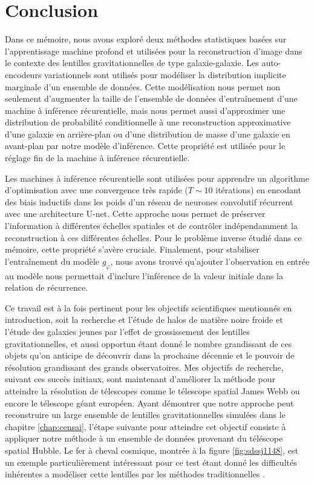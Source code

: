 \chapter{Conclusion}
Dans ce mémoire, nous avons exploré deux méthodes statistiques basées sur l'apprentissage machine profond et
utilisées pour la reconstruction d'image dans le contexte des lentilles gravitationnelles de type galaxie-galaxie.
Les auto-encodeurs variationnels sont utilisés pour modéliser la distribution implicite marginale d'un 
ensemble de données. Cette modélisation nous permet non seulement d'augmenter la taille de l'ensemble 
de données d'entraînement d'une machine à inférence récurentielle, mais nous permet aussi d'approximer 
une distribution de probabilité conditionnelle à une reconstruction approximative d'une galaxie 
en arrière-plan ou d'une distribution de masse d'une galaxie en avant-plan par notre modèle d'inférence. 
Cette propriété est utilisée pour le réglage fin de la machine à inférence récurentielle.

Les machines à inférence récurentielle sont utilisées pour apprendre un algorithme d'optimisation avec une convergence 
très rapide ($T \sim 10$ itérations)
en encodant des biais inductifs dans les poids d'un réseau de neurones convolutif récurrent avec une architecture U-net. 
Cette approche nous permet de préserver l'information à différentes échelles spatiales et de contrôler indépendamment 
la reconstruction à ces différentes échelles. Pour le problème inverse étudié dans ce mémoire, cette propriété s'avère cruciale. 
Finalement, pour stabiliser l'entraînement du modèle $g_\varphi$, nous avons trouvé qu'ajouter l'observation 
en entrée au modèle nous permettait d'inclure l'inférence de la valeur initiale dans la relation de récurrence. 

Ce travail est à la fois pertinent pour les objectifs scientifiques mentionnés en introduction, soit la recherche et l'étude 
de halos de matière noire froide et l'étude des galaxies jeunes par l'effet de grossissement des lentilles gravitationnelles, 
et aussi opportun étant donné le nombre grandissant de ces objets qu'on anticipe de découvrir dans la prochaine décennie et 
le pouvoir de résolution grandissant des grands observatoires. Mes objectifs de recherche, suivant ces succès initiaux, sont maintenant 
d'améliorer la méthode pour atteindre la résolution de télescopes comme le télescope spatial James Webb ou encore le télescope 
géant européen. Ayant démontrer que notre approche peut reconstruire un large ensemble de lentilles 
gravitationnelles simulées dans le chapitre \ref{chap:censai}, l'étape suivante pour atteindre cet objectif consiste 
à appliquer notre 
méthode à un ensemble de données provenant du téléscope spatial Hubble. 
Le fer à cheval cosmique, montrée à la figure \ref{fig:sdssj1148}, est un exemple 
particulièrement intéressant pour ce test étant donné les difficultés inhérentes a modéliser 
cette lentilles par les méthodes traditionnelles \citep{James2018,Schuldt2019,Cheng2019}.

